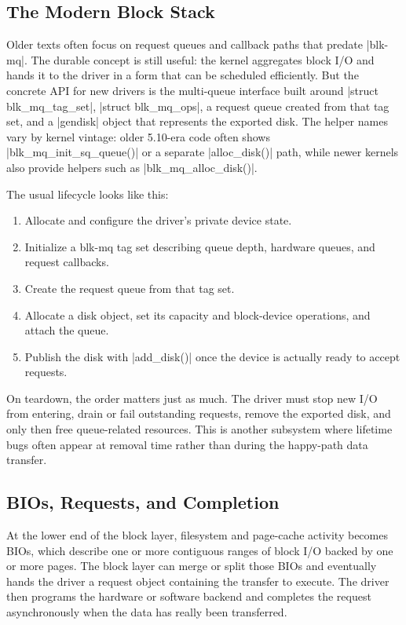 \documentclass[10pt, oneside]{book}
\begin{document}
\subsection{The Modern Block Stack}
\label{sec:block_stack}
Older texts often focus on request queues and callback paths that predate
\cpp|blk-mq|.
The durable concept is still useful: the kernel aggregates block I/O and hands
it to the driver in a form that can be scheduled efficiently.
But the concrete API for new drivers is the multi-queue interface built around
\cpp|struct blk_mq_tag_set|, \cpp|struct blk_mq_ops|, a request queue created
from that tag set, and a \cpp|gendisk| object that represents the exported
disk.
The helper names vary by kernel vintage: older 5.10-era code often shows
\cpp|blk_mq_init_sq_queue()| or a separate \cpp|alloc_disk()| path, while newer
kernels also provide helpers such as \cpp|blk_mq_alloc_disk()|.

The usual lifecycle looks like this:
\begin{enumerate}
  \item Allocate and configure the driver's private device state.
  \item Initialize a blk-mq tag set describing queue depth, hardware queues, and request callbacks.
  \item Create the request queue from that tag set.
  \item Allocate a disk object, set its capacity and block-device operations, and attach the queue.
  \item Publish the disk with \cpp|add_disk()| once the device is actually ready to accept requests.
\end{enumerate}

On teardown, the order matters just as much.
The driver must stop new I/O from entering, drain or fail outstanding requests,
remove the exported disk, and only then free queue-related resources.
This is another subsystem where lifetime bugs often appear at removal time
rather than during the happy-path data transfer.

\subsection{BIOs, Requests, and Completion}
\label{sec:block_io_path}
At the lower end of the block layer, filesystem and page-cache activity becomes
BIOs, which describe one or more contiguous ranges of block I/O backed by one
or more pages.
The block layer can merge or split those BIOs and eventually hands the driver a
request object containing the transfer to execute.
The driver then programs the hardware or software backend and completes the
request asynchronously when the data has really been transferred.
\end{document}
